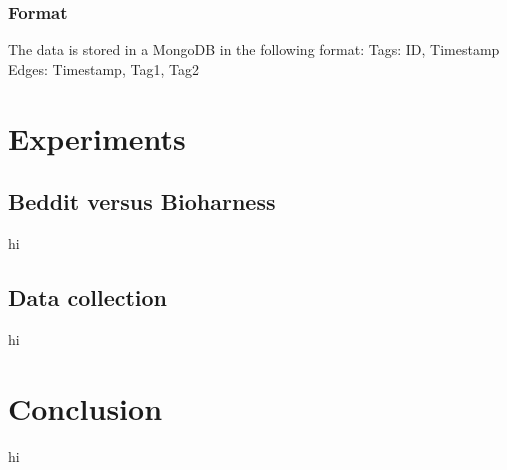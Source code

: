 		\subsubsection{Format}
		The data is stored in a MongoDB in the following format:
		Tags: ID, Timestamp
		Edges: Timestamp, Tag1, Tag2
			
\section{Experiments}
	\subsection{Beddit versus Bioharness}
		hi
	\subsection{Data collection}
		hi
\section{Conclusion}
	hi
